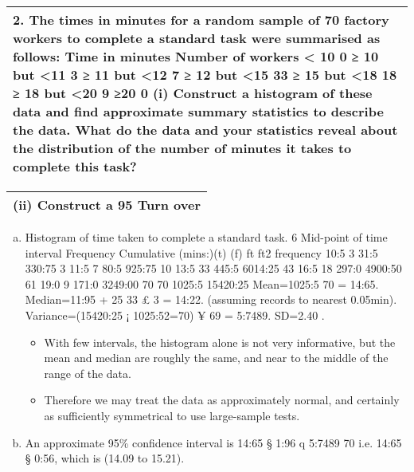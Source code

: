 \documentclass[a4paper,12pt]{article}
\begin{document}
\begin{table}[ht!]
 
\centering
 
\begin{tabular}{|p{15cm}|}
 
\hline  

2. The times in minutes for a random sample of 70 factory workers to complete a standard task were summarised as follows:
      Time in minutes Number of workers 
< 10  0 
≥ 10 but <11  3 
≥ 11 but <12  7 
≥ 12 but <15 33 
≥ 15 but <18 18 
≥ 18 but <20  9 
≥20  0
(i) Construct a histogram of these data and find approximate summary statistics to describe the data.  What do the data and your statistics reveal about the distribution of the number of minutes it takes to complete this task?

\\ \hline
  
\end{tabular}

\end{table}
\begin{table}[ht!]
 
\centering
 
\begin{tabular}{|p{15cm}|}
 
\hline  

(ii) Construct a 95%
Turn over
\\ \hline
  
\end{tabular}

\end{table}

\begin{enumerate}[(a)]


\item Histogram of time taken to complete a standard task.
6
Mid-point of
time interval Frequency Cumulative
(mins:)(t) (f) ft ft2 frequency
10:5 3 31:5 330:75 3
11:5 7 80:5 925:75 10
13:5 33 445:5 6014:25 43
16:5 18 297:0 4900:50 61
19:0 9 171:0 3249:00 70
70 1025:5 15420:25
Mean=1025:5
70 = 14:65.
Median=11:95 + 25
33 £ 3 = 14:22.
(assuming records to nearest 0.05min).
Variance=(15420:25 ¡ 1025:52=70) ¥ 69 = 5:7489. SD=2.40 .
\begin{itemize}
    \item With few intervals, the histogram alone is not very informative, but the mean and median are
roughly the same, and near to the middle of the range of the data. \item Therefore we may treat the
data as approximately normal, and certainly as sufficiently symmetrical to use large-sample tests.
\end{itemize}
\item An approximate 95\% confidence interval is 14:65 § 1:96
q
5:7489
70 i.e. 14:65 § 0:56, which is
(14.09 to 15.21).
\end{enumerate}
\end{document}
